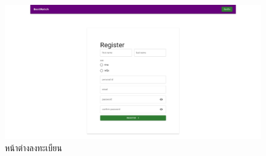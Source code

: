 \begin{enumerate}
        \begin{figure}[h]
          \begin{center}
            \includegraphics[width=\linewidth]{photo/web/student/register.jpeg}
          \end{center}
          \caption{หน้าต่างลงทะเบียน}
          \label{fig:register}
        \end{figure}
        

\end{enumerate}
